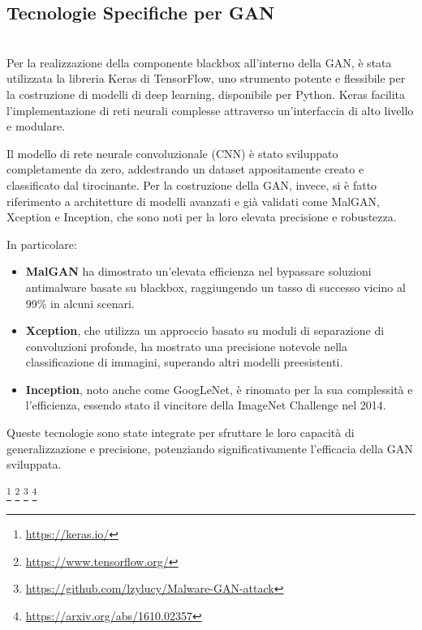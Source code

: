 \subsection{Tecnologie Specifiche per GAN}
~\\
\indent Per la realizzazione della componente blackbox all'interno della GAN, è stata utilizzata la libreria Keras di TensorFlow, uno strumento potente e flessibile per la costruzione di modelli di deep learning, disponibile per Python. Keras facilita l'implementazione di reti neurali complesse attraverso un'interfaccia di alto livello e modulare.

Il modello di rete neurale convoluzionale (CNN) è stato sviluppato completamente da zero, addestrando un dataset appositamente creato e classificato dal tirocinante. Per la costruzione della GAN, invece, si è fatto riferimento a architetture di modelli avanzati e già validati come MalGAN, Xception e Inception, che sono noti per la loro elevata precisione e robustezza.

In particolare:
\begin{itemize}
    \item \textbf{MalGAN} ha dimostrato un'elevata efficienza nel bypassare soluzioni antimalware basate su blackbox, raggiungendo un tasso di successo vicino al 99\% in alcuni scenari.
    \item \textbf{Xception}, che utilizza un approccio basato su moduli di separazione di convoluzioni profonde, ha mostrato una precisione notevole nella classificazione di immagini, superando altri modelli preesistenti.
    \item \textbf{Inception}, noto anche come GoogLeNet, è rinomato per la sua complessità e l'efficienza, essendo stato il vincitore della ImageNet Challenge nel 2014.
\end{itemize}

Queste tecnologie sono state integrate per sfruttare le loro capacità di generalizzazione e precisione, potenziando significativamente l'efficacia della GAN sviluppata.

\footnote{\url{https://keras.io/}}
\footnote{\url{https://www.tensorflow.org/}}
\footnote{\url{https://github.com/lzylucy/Malware-GAN-attack}}
\footnote{\url{https://arxiv.org/abs/1610.02357}}




